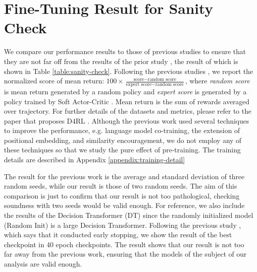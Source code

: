 \documentclass{article}
\begin{document}
\section{Fine-Tuning Result for Sanity Check}
\label{appendix:fine-tuning-result}
We compare our performance results to those of previous studies to ensure that they are not  far off from the results of the prior study \cite{reid2022can}, the result of which is shown in Table \ref{table:sanity-check}. Following the previous studies \cite{fu2020d4rl,chen2021decision,reid2022can}, we report the normalized score of mean return: $100 \times \frac{\text{score} - \text{random score}}{\text{expert score} - \text{random score}}$, where \textit{random score} is mean return generated by a random policy and \textit{expert score} is generated by a policy trained by Soft Actor-Critic \cite{haarnoja2018soft}. Mean return is the sum of rewards averaged over trajectory.
For further details of the datasets and metrics, please refer to the paper that proposes D4RL \cite{fu2020d4rl}. Although the previous work \cite{reid2022can} used several techniques to improve the performance, e.g. language model co-training, the extension of positional embedding, and similarity encouragement, we do not employ any of these techniques so that we study the pure effect of pre-training. The training details are described in Appendix \ref{appendix:training-detail}

The result for the previous work is the average and standard deviation of three random seeds, while our result is those of two random seeds. The aim of this comparison is just to confirm that our result is not too pathological, checking soundness with two seeds would be valid enough. For reference, we also include the results of the Decision Transformer (DT) since the randomly initialized model (Random Init) is a large Decision Transformer. Following the previous study \cite{reid2022can}, which says that it conducted early stopping, we show the result of the best checkpoint in 40 epoch checkpoints. The result shows that our result is not too far away from the previous work, ensuring that the models of the subject of our analysis are valid enough.
\end{document}
